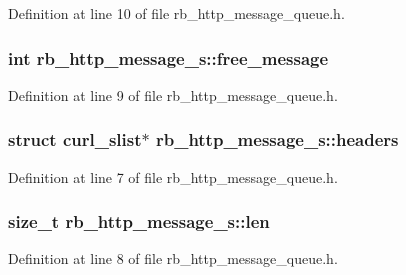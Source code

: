 Definition at line 10 of file rb\+\_\+http\+\_\+message\+\_\+queue.\+h.

\hypertarget{structrb__http__message__s_acbfdd79b7ec041a7b7e0edac1da72d30}{}
\subsubsection[{free\+\_\+message}]{\setlength{\rightskip}{0pt plus 5cm}int rb\+\_\+http\+\_\+message\+\_\+s\+::free\+\_\+message}\label{structrb__http__message__s_acbfdd79b7ec041a7b7e0edac1da72d30}


Definition at line 9 of file rb\+\_\+http\+\_\+message\+\_\+queue.\+h.

\hypertarget{structrb__http__message__s_ae12176a1bd60ed536eda95e2c530acc4}{}
\subsubsection[{headers}]{\setlength{\rightskip}{0pt plus 5cm}struct curl\+\_\+slist$\ast$ rb\+\_\+http\+\_\+message\+\_\+s\+::headers}\label{structrb__http__message__s_ae12176a1bd60ed536eda95e2c530acc4}


Definition at line 7 of file rb\+\_\+http\+\_\+message\+\_\+queue.\+h.

\hypertarget{structrb__http__message__s_a8c352ee939f1cd197bf009583e61552f}{}
\subsubsection[{len}]{\setlength{\rightskip}{0pt plus 5cm}size\+\_\+t rb\+\_\+http\+\_\+message\+\_\+s\+::len}\label{structrb__http__message__s_a8c352ee939f1cd197bf009583e61552f}


Definition at line 8 of file rb\+\_\+http\+\_\+message\+\_\+queue.\+h.

\hypertarget{structrb__http__message__s_a70cd28f794d09eb47cf19a37fb7ba42b}{}
